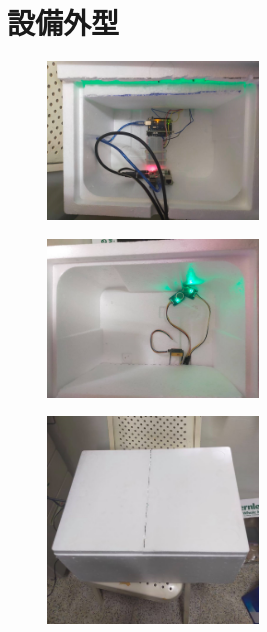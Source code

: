 \section{設備外型}
\begin{figure}[H]
	\centering
	\includegraphics[width=0.5\textwidth]{../../pic/box(1).jpg}
\end{figure}
\begin{figure}[H]
	\centering
	\includegraphics[width=0.5\textwidth]{../../pic/box(2).jpg}
\end{figure}
\begin{figure}[H]
	\centering
	\includegraphics[width=0.5\textwidth]{../../pic/box(3).jpg}
\end{figure}